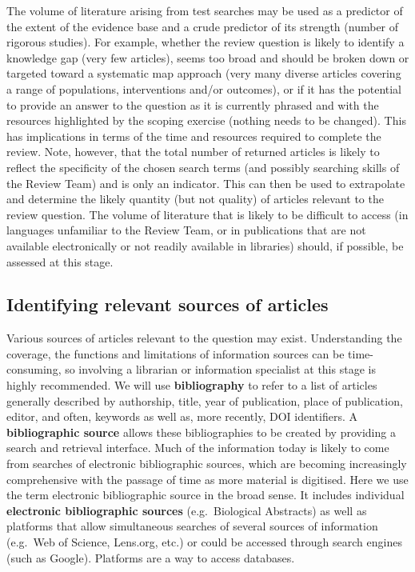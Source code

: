 \documentclass[
  letterpaper,
  DIV=11,
  numbers=noendperiod]{scrreprt}
\begin{document}
The volume of literature arising from test searches may be used as a
predictor of the extent of the evidence base and a crude predictor of
its strength (number of rigorous studies). For example, whether the
review question is likely to identify a knowledge gap (very few
articles), seems too broad and should be broken down or targeted toward
a systematic map approach (very many diverse articles covering a range
of populations, interventions and/or outcomes), or if it has the
potential to provide an answer to the question as it is currently
phrased and with the resources highlighted by the scoping exercise
(nothing needs to be changed). This has implications in terms of the
time and resources required to complete the review. Note, however, that
the total number of returned articles is likely to reflect the
specificity of the chosen search terms (and possibly searching skills of
the Review Team) and is only an indicator. This can then be used to
extrapolate and determine the likely quantity (but not quality) of
articles relevant to the review question. The volume of literature that
is likely to be difficult to access (in languages unfamiliar to the
Review Team, or in publications that are not available electronically or
not readily available in libraries) should, if possible, be assessed at
this stage.

\subsection{Identifying relevant sources of
articles}\label{identifying-relevant-sources-of-articles}

Various sources of articles relevant to the question may exist.
Understanding the coverage, the functions and limitations of information
sources can be time-consuming, so involving a librarian or information
specialist at this stage is highly recommended. We will use
\textbf{bibliography} to refer to a list of articles generally described
by authorship, title, year of publication, place of publication, editor,
and often, keywords as well as, more recently, DOI identifiers. A
\textbf{bibliographic source} allows these bibliographies to be created
by providing a search and retrieval interface. Much of the information
today is likely to come from searches of electronic bibliographic
sources, which are becoming increasingly comprehensive with the passage
of time as more material is digitised. Here we use the term electronic
bibliographic source in the broad sense. It includes individual
\textbf{electronic bibliographic sources} (e.g.~Biological Abstracts) as
well as platforms that allow simultaneous searches of several sources of
information (e.g.~Web of Science, Lens.org, etc.) or could be accessed
through search engines (such as Google). Platforms are a way to access
databases.
\end{document}
